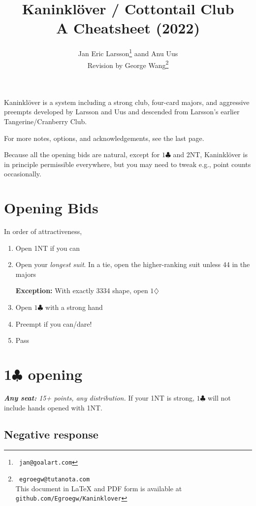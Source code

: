 \documentclass[a4paper, twoside, 11pt]{article}
\title{Kaninklöver / Cottontail Club\\A Cheatsheet (2022)}
\author{
Jan Eric Larsson\footnote{\normalsize{\texttt{ jan@goalart.com}}} \hphantom aand Anu Uus \\
Revision by George Wang\footnote{\normalsize{\texttt{ egroegw@tutanota.com} \\
This document  in LaTeX and PDF form is available at \texttt{github.com/Egroegw/Kaninklover}}}
}
\date{}
\begin{document}
\maketitle

\vspace{0cm}
\begin{multicols}{3}

\itshape

Kaninklöver is a system including a strong club, four-card majors, and aggressive preempts developed by Larsson and Uus and descended from Larsson's earlier Tangerine/Cranberry Club.

For more notes, options, and acknowledgements, see the last page.

Because all the opening bids are natural, except for $1\clubsuit$ and 2NT, Kaninklöver is in principle permissible everywhere, but you may need to tweak e.g., point counts occasionally.

\upshape
\section{Opening Bids}
In order of attractiveness,
\begin{enumerate}
    \item Open \textnormal{1NT} if you can
    \item Open your \textit{longest suit}.
    In a tie, open the higher-ranking suit unless 44 in the majors

     \textbf{Exception:} With exactly 3334 shape, open $1\diamondsuit$
    \item Open $1\clubsuit$ with a strong hand
    \item Preempt if you can/dare!
    \item Pass
\end{enumerate}



\section{1$\clubsuit$ opening}

\textit{\textbf{Any seat:} 15+ points, any distribution.}
If your 1NT is strong, $1\clubsuit$ will not include hands opened with 1NT.


\subsection*{Negative response}


\end{multicols}
\end{document}
